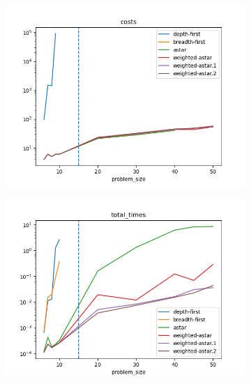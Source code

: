 \documentclass[12pt]{article}
\begin{document}
\begin{figure}
    \centering
    \begin{subfigure}[]{.49\textwidth}
        \includegraphics[width=\textwidth]{figures/costs.png}
        \caption{}
    \end{subfigure}
    \begin{subfigure}[]{.49\textwidth}
        \includegraphics[width=\textwidth]{figures/total_times.png}
        \caption{}
    \end{subfigure}
    \begin{subfigure}[]{.49\textwidth}

\end{subfigure}
\end{figure}
\end{document}
